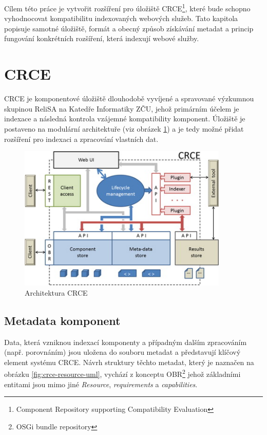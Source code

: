 \documentclass[czech,DP]{thesiskiv}
\begin{document}
Cílem této práce je vytvořit rozšíření pro úložiště CRCE\footnote{Component Repository supporting Compatibility Evaluation}, které bude schopno vyhodnocovat kompatibilitu indexovaných webových služeb. Tato kapitola popisuje samotné úložiště, formát a obecný způsob získávání metadat a princip fungování konkrétních rozšíření, která indexují webové služby.

\section{CRCE}


CRCE je komponentové úložiště dlouhodobě vyvíjené a spravované výzkumnou skupinou ReliSA na Katedře Informatiky ZČU, jehož primárním účelem je indexace a následná kontrola vzájemné kompatibility komponent. Úložiště je postaveno na modulární architektuře (viz obrázek \ref{fig:crce-arch}) a je tedy možné přidat rozšíření pro indexaci a zpracování vlastních dat.

\begin{figure}[h]
	\centering
	\includegraphics[width=10cm]{crce-arch.jpg}
	\caption{Architektura CRCE}
	\label{fig:crce-arch}
\end{figure} 

\subsection{Metadata komponent}
\label{subsec:crce-metadata}

Data, která vzniknou indexací komponenty a případným dalším zpracováním (např. porovnáním) jsou uložena do souboru metadat a představují klíčový element systému CRCE. Návrh struktury  těchto metadat, který je naznačen na obrázku \ref{fig:crce-resource-uml}, vychází z konceptu OBR\footnote{OSGi bundle repository} jehož základními entitami jsou mimo jiné \textit{Resource}, \textit{requirements} a \textit{capabilities}\cite{brada2015repository}. 
\end{document}
